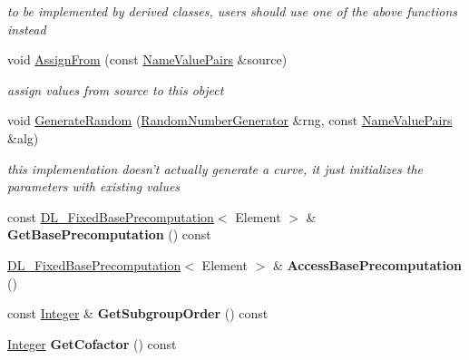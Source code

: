 \begin{DoxyCompactItemize}
\begin{DoxyCompactList}\small\item\em to be implemented by derived classes, users should use one of the above functions instead \item\end{DoxyCompactList}\item 
void \hyperlink{class_d_l___group_parameters___e_c_a8fa1181ce7cf91f12ba6de286d1da5bd}{AssignFrom} (const \hyperlink{class_name_value_pairs}{NameValuePairs} \&source)
\begin{DoxyCompactList}\small\item\em assign values from source to this object \item\end{DoxyCompactList}\item 
void \hyperlink{class_d_l___group_parameters___e_c_a519a33d073fe5bf2f278a0de75a404ab}{GenerateRandom} (\hyperlink{class_random_number_generator}{RandomNumberGenerator} \&rng, const \hyperlink{class_name_value_pairs}{NameValuePairs} \&alg)
\begin{DoxyCompactList}\small\item\em this implementation doesn't actually generate a curve, it just initializes the parameters with existing values \item\end{DoxyCompactList}\item 
\hypertarget{class_d_l___group_parameters___e_c_ae7c50334137caa4f4f9e0d7cb5627a83}{
const \hyperlink{class_d_l___fixed_base_precomputation}{DL\_\-FixedBasePrecomputation}$<$ Element $>$ \& {\bfseries GetBasePrecomputation} () const }
\label{class_d_l___group_parameters___e_c_ae7c50334137caa4f4f9e0d7cb5627a83}

\item 
\hypertarget{class_d_l___group_parameters___e_c_a265ae70adae244ace472ef7f97052eda}{
\hyperlink{class_d_l___fixed_base_precomputation}{DL\_\-FixedBasePrecomputation}$<$ Element $>$ \& {\bfseries AccessBasePrecomputation} ()}
\label{class_d_l___group_parameters___e_c_a265ae70adae244ace472ef7f97052eda}

\item 
\hypertarget{class_d_l___group_parameters___e_c_a0771e5062e86752a4155254899ba758d}{
const \hyperlink{class_integer}{Integer} \& {\bfseries GetSubgroupOrder} () const }
\label{class_d_l___group_parameters___e_c_a0771e5062e86752a4155254899ba758d}

\item 
\hypertarget{class_d_l___group_parameters___e_c_aafad8bb0b39a9d49c1ac21818f9dbf12}{
\hyperlink{class_integer}{Integer} {\bfseries GetCofactor} () const }
\label{class_d_l___group_parameters___e_c_aafad8bb0b39a9d49c1ac21818f9dbf12}


\end{DoxyCompactItemize}
